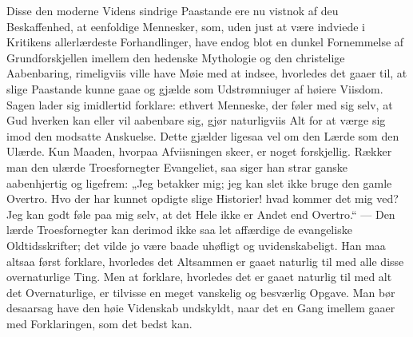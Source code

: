 \documentclass[12pt,a4paper]{book}
\begin{document}
Disse den moderne Videns sindrige Paastande ere nu vistnok af deu Beskaffenhed,
at eenfoldige Mennesker, som, uden just at være indviede i Kritikens
allerlærdeste Forhandlinger, have endog blot en dunkel Fornemmelse af
Grundforskjellen imellem den hedenske Mythologie og den christelige Aabenbaring,
rimeligviis ville have Møie med at indsee, hvorledes det gaaer til, at slige
Paastande kunne gaae og gjælde som Udstrømniuger af høiere Viisdom.
Sagen lader sig imidlertid forklare: ethvert Menneske, der føler med sig selv, at
Gud hverken kan eller vil aabenbare sig, gjør naturligviis Alt for at værge sig
imod den modsatte Anskuelse. Dette gjælder ligesaa vel om den Lærde som den
Ulærde.
Kun Maaden, hvorpaa Afviisningen skeer, er noget forskjellig. Rækker man den
ulærde Troesfornegter Evangeliet, saa siger han strar ganske aabenhjertig og
ligefrem: „Jeg betakker mig; jeg kan slet ikke bruge den gamle Overtro. Hvo der
har kunnet opdigte slige Historier! hvad kommer det mig ved? Jeg kan godt føle
paa mig selv, at det Hele ikke er Andet end Overtro.“ --- Den lærde
Troesfornegter kan derimod ikke saa let affærdige de evangeliske
Oldtidsskrifter; det vilde jo være baade uhøfligt og uvidenskabeligt. Han maa
altsaa først forklare, hvorledes det Altsammen er gaaet naturlig til med alle
disse overnaturlige Ting. Men at forklare, hvorledes det er gaaet naturlig til
med alt det Overnaturlige, er tilvisse en meget vanskelig og besværlig Opgave.
Man bør desaarsag have den høie Videnskab undskyldt, naar det en Gang imellem
gaaer med Forklaringen, som det bedst kan.
\end{document}
